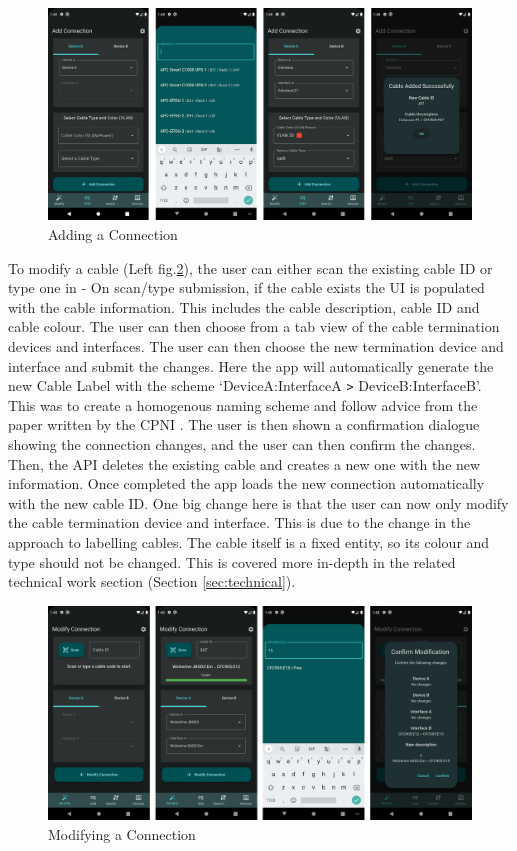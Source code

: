 \documentclass [11pt,a4paper]{article}
\begin{document}
\begin{figure}[H]
    \centering
    \includegraphics[width=1\textwidth]{images/final_add.png}
    \caption{Adding a Connection}
    \label{fig:add_connection}
\end{figure}
To modify a cable (Left fig.\ref{fig:modify_connection}), the user can either scan the existing cable ID or type one in - On scan/type submission, if the cable exists the UI is populated with the cable information. This includes the cable description, cable ID and cable colour. The user can then choose from a tab view of the cable termination devices and interfaces. The user can then choose the new termination device and interface and submit the changes. Here the app will automatically generate the new Cable Label with the scheme `DeviceA:InterfaceA \verb|>| DeviceB:InterfaceB'. This was to create a homogenous naming scheme and follow advice from the paper written by the CPNI \cite{cpni}. The user is then shown a confirmation dialogue showing the connection changes, and the user can then confirm the changes. Then, the API deletes the existing cable and creates a new one with the new information. Once completed the app loads the new connection automatically with the new cable ID. One big change here is that the user can now only modify the cable termination device and interface. This is due to the change in the approach to labelling cables. The cable itself is a fixed entity, so its colour and type should not be changed. This is covered more in-depth in the related technical work section (Section \ref{sec:technical}).

\begin{figure}[H]
    \centering
    \includegraphics[width=1\textwidth]{images/final_modify.png}
    \caption{Modifying a Connection}
    \label{fig:modify_connection}
\end{figure}
\end{document}
